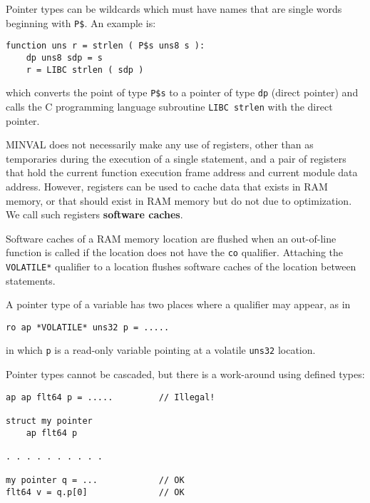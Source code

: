 \documentclass[12pt]{article}
\newcommand{\skey}[2]{{\rm \bfseries #1#2}}
\newenvironment{indpar}[1][0.3in]%
	{\begin{list}{}%
		     {\setlength{\itemsep}{0in}%
		      \setlength{\topsep}{0in}%
		      \setlength{\parsep}{1ex}%
		      \setlength{\labelwidth}{#1}%
		      \setlength{\leftmargin}{#1}%
		      \addtolength{\leftmargin}{\labelsep}}%
	 \item}%
	{\end{list}}
\begin{document}
Pointer types can be wildcards which must have names that are
single words beginning with {\tt P\$}.  An example is:

\begin{indpar}\begin{verbatim}
function uns r = strlen ( P$s uns8 s ):
    dp uns8 sdp = s
    r = LIBC strlen ( sdp )
\end{verbatim}\end{indpar}

which converts the point of type {\tt P\$s} to a pointer of
type {\tt dp} (direct pointer) and calls the C programming
language subroutine {\tt LIBC strlen} with the direct pointer.

MINVAL does not necessarily make any use of registers, other
than as temporaries during the execution of a single statement,
and a pair of registers that hold the current function
execution frame address and current module data address.
However, registers can be used to cache data that exists in
RAM memory, or that should exist in RAM memory but do not
due to optimization.  We call such registers
\skey{software cach}{es}.

Software caches of a RAM memory location are flushed when an out-of-line
function is called if the location does not have the {\tt co} qualifier.
Attaching the {\tt *VOLATILE*} qualifier to a location
flushes software caches of the location between statements.

A pointer type of a variable
has two places where a qualifier may appear, as in

\begin{indpar}\begin{verbatim}
ro ap *VOLATILE* uns32 p = .....
\end{verbatim}\end{indpar}
in which {\tt p} is a read-only variable pointing at a volatile
{\tt uns32} location.

Pointer types cannot be cascaded, but there is a work-around
using defined types:
\begin{indpar}\begin{verbatim}
ap ap flt64 p = .....         // Illegal!

struct my pointer
    ap flt64 p

. . . . . . . . . .

my pointer q = ...            // OK
flt64 v = q.p[0]              // OK
\end{verbatim}\end{indpar}
\end{document}

